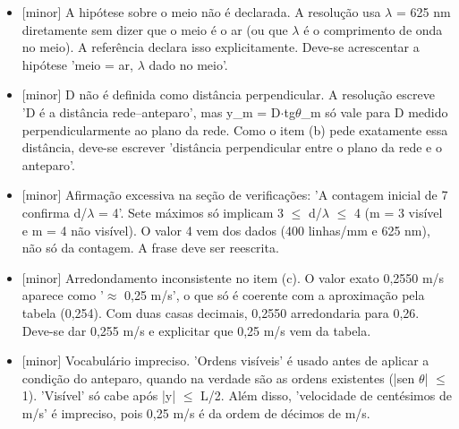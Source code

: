 \documentclass{article}%
\begin{document}
\begin{itemize}%
\item%
{[}minor{]} A hipótese sobre o meio não é declarada. A resolução usa $\lambda$ = 625 nm diretamente sem dizer que o meio é o ar (ou que $\lambda$ é o comprimento de onda no meio). A referência declara isso explicitamente. Deve{-}se acrescentar a hipótese 'meio = ar, $\lambda$ dado no meio'.%
\item%
{[}minor{]} D não é definida como distância perpendicular. A resolução escreve 'D é a distância rede--anteparo', mas y\_m = D$\cdot$tg$\theta$\_m só vale para D medido perpendicularmente ao plano da rede. Como o item (b) pede exatamente essa distância, deve{-}se escrever 'distância perpendicular entre o plano da rede e o anteparo'.%
\item%
{[}minor{]} Afirmação excessiva na seção de verificações: 'A contagem inicial de 7 confirma d/$\lambda$ = 4'. Sete máximos só implicam 3 $\leq$ d/$\lambda$ $\leq$ 4 (m = 3 visível e m = 4 não visível). O valor 4 vem dos dados (400 linhas/mm e 625 nm), não só da contagem. A frase deve ser reescrita.%
\item%
{[}minor{]} Arredondamento inconsistente no item (c). O valor exato 0,2550 m/s aparece como '$\approx$ 0,25 m/s', o que só é coerente com a aproximação pela tabela (0,254). Com duas casas decimais, 0,2550 arredondaria para 0,26. Deve{-}se dar 0,255 m/s e explicitar que 0,25 m/s vem da tabela.%
\item%
{[}minor{]} Vocabulário impreciso. 'Ordens visíveis' é usado antes de aplicar a condição do anteparo, quando na verdade são as ordens existentes (|sen $\theta$| $\leq$ 1). 'Visível' só cabe após |y| $\leq$ L/2. Além disso, 'velocidade de centésimos de m/s' é impreciso, pois 0,25 m/s é da ordem de décimos de m/s.%
\end{itemize}%
\end{document}
